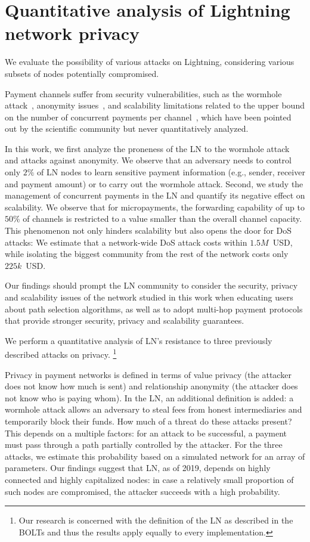\chapter{Quantitative analysis of Lightning network privacy}

\label{Chapter07LNattacks}

We evaluate the possibility of various attacks on Lightning, considering various subsets of nodes potentially compromised.

Payment channels suffer from security vulnerabilities, such as the wormhole attack~\cite{Malavolta2019}, anonymity issues~\cite{Malavolta2017}, and scalability limitations related to  the upper bound on the number of concurrent payments per channel~\cite{EmelyanenkoK2017}, which have been pointed out by the scientific community but never quantitatively analyzed. 

In this work, we first analyze the proneness of the LN to the wormhole attack and attacks against anonymity. 
We observe that an adversary needs to control only $2\%$ of LN nodes to learn sensitive payment information (e.g., sender, receiver and payment amount) or to carry out the wormhole attack. 
Second, we study the management of concurrent payments in the LN and quantify its negative effect on scalability. 
We observe that for micropayments, the forwarding capability of up to $50\%$ of channels is restricted to 
a value smaller than the overall channel capacity.
This phenomenon not only hinders scalability but also opens the door for DoS attacks: We estimate that 
a network-wide DoS attack costs within $1.5M$~USD, while isolating the biggest community from the rest of the network costs only $225k$~USD.

Our findings should prompt the LN community to consider the security, privacy and scalability issues of the network studied in this work 
when educating users about path selection algorithms, as well as to adopt multi-hop payment protocols that provide stronger security, privacy and 
scalability guarantees. 

We perform a quantitative analysis of LN's resistance to three previously described attacks on privacy.
\footnote{Our research is concerned with the definition of the LN as described in the BOLTs and thus the results apply equally to every implementation.}

Privacy in payment networks is defined in terms of value privacy (the attacker does not know how much is sent) and relationship anonymity (the attacker does not know who is paying whom).
In the LN, an additional definition is added: a wormhole attack allows an adversary to steal fees from honest intermediaries and temporarily block their funds.
How much of a threat do these attacks present?
This depends on a multiple factors: for an attack to be successful, a payment must pass through a path partially controlled by the attacker.
For the three attacks, we estimate this probability based on a simulated network for an array of parameters.
Our findings suggest that LN, as of 2019, depends on highly connected and highly capitalized nodes: in case a relatively small proportion of such nodes are compromised, the attacker succeeds with a high probability.



